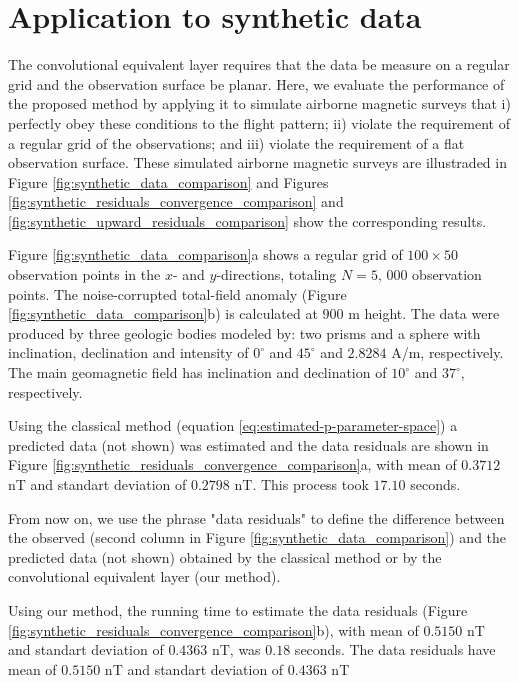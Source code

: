 \section{Application to synthetic data}

The convolutional equivalent layer requires that the data be measure on a regular grid and the observation surface be planar.
Here, we evaluate the performance of the proposed method by applying it to simulate airborne magnetic surveys 
that i) perfectly obey these conditions to the flight pattern; ii) violate the requirement of a regular grid of the observations; and iii) violate the requirement of a flat observation surface.
These simulated airborne magnetic surveys are illustraded in Figure \ref{fig:synthetic_data_comparison} 
and Figures  \ref{fig:synthetic_residuals_convergence_comparison} and  \ref{fig:synthetic_upward_residuals_comparison} show the corresponding results.

Figure \ref{fig:synthetic_data_comparison}a shows a regular grid of  $100 \times 50$ observation points in the $x$- and $y$-directions, totaling  $N = 5,\, 000$ observation points. 
The noise-corrupted total-field anomaly (Figure \ref{fig:synthetic_data_comparison}b) is calculated at $900$ m height.
The data were produced by three geologic bodies modeled by: two prisms and a sphere with inclination, declination and intensity of $0^{\circ}$ and $45^{\circ}$ and $2.8284$ A/m, respectively. 
The main geomagnetic field has inclination and declination of $10^{\circ}$ and $37^{\circ}$, respectively. 

Using the classical method (equation \ref{eq:estimated-p-parameter-space}) a predicted data
(not shown) was estimated and the data residuals are shown in Figure \ref{fig:synthetic_residuals_convergence_comparison}a, 
with mean of $0.3712$ nT and standart deviation of $0.2798$ nT.
This process took $17.10$ seconds.

From now on, we use the phrase "data residuals" to define the difference between the observed (second column in Figure \ref{fig:synthetic_data_comparison}) and the predicted data (not shown) obtained by the classical method or by the convolutional equivalent layer (our method). 


Using our method, the running time to estimate the data residuals (Figure \ref{fig:synthetic_residuals_convergence_comparison}b), with mean of $0.5150$ nT and standart deviation of $0.4363$ nT, was $0.18$ seconds.
The data residuals have mean of $0.5150$ nT and standart deviation of $0.4363$ nT 

